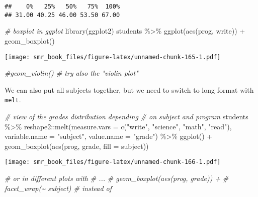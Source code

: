 \documentclass[
  oneside]{book}
\newenvironment{Shaded}{\begin{snugshade}}{\end{snugshade}}
\newcommand{\AttributeTok}[1]{\textcolor[rgb]{0.77,0.63,0.00}{#1}}
\newcommand{\CommentTok}[1]{\textcolor[rgb]{0.56,0.35,0.01}{\textit{#1}}}
\newcommand{\FunctionTok}[1]{\textcolor[rgb]{0.00,0.00,0.00}{#1}}
\newcommand{\NormalTok}[1]{#1}
\newcommand{\SpecialCharTok}[1]{\textcolor[rgb]{0.00,0.00,0.00}{#1}}
\newcommand{\StringTok}[1]{\textcolor[rgb]{0.31,0.60,0.02}{#1}}
\begin{document}
\begin{verbatim}
##    0%   25%   50%   75%  100% 
## 31.00 40.25 46.00 53.50 67.00
\end{verbatim}

\begin{Shaded}
\begin{Highlighting}[]
\CommentTok{\# boxplot in ggplot}
\FunctionTok{library}\NormalTok{(ggplot2)}
\NormalTok{students }\SpecialCharTok{\%\textgreater{}\%}
  \FunctionTok{ggplot}\NormalTok{(}\FunctionTok{aes}\NormalTok{(prog, write)) }\SpecialCharTok{+}
  \FunctionTok{geom\_boxplot}\NormalTok{()}
\end{Highlighting}
\end{Shaded}

\texttt{[image: smr\_book\_files/figure-latex/unnamed-chunk-165-1.pdf]}

\begin{Shaded}
\begin{Highlighting}[]
  \CommentTok{\#geom\_violin() \# try also the "violin plot"}
\end{Highlighting}
\end{Shaded}

We can also put all subjects together, but we need to
switch to long format with \texttt{melt}.

\begin{Shaded}
\begin{Highlighting}[]
\CommentTok{\# view of the grades distribution depending}
\CommentTok{\# on subject and program}
\NormalTok{students }\SpecialCharTok{\%\textgreater{}\%}
\NormalTok{  reshape2}\SpecialCharTok{::}\FunctionTok{melt}\NormalTok{(}\AttributeTok{measure.vars =} \FunctionTok{c}\NormalTok{(}\StringTok{"write"}\NormalTok{, }\StringTok{"science"}\NormalTok{, }\StringTok{"math"}\NormalTok{, }\StringTok{"read"}\NormalTok{),}
       \AttributeTok{variable.name =} \StringTok{"subject"}\NormalTok{,}
       \AttributeTok{value.name =} \StringTok{"grade"}\NormalTok{) }\SpecialCharTok{\%\textgreater{}\%}
  \FunctionTok{ggplot}\NormalTok{() }\SpecialCharTok{+}
    \FunctionTok{geom\_boxplot}\NormalTok{(}\FunctionTok{aes}\NormalTok{(prog, grade, }\AttributeTok{fill =}\NormalTok{ subject))}
\end{Highlighting}
\end{Shaded}

\texttt{[image: smr\_book\_files/figure-latex/unnamed-chunk-166-1.pdf]}

\begin{Shaded}
\begin{Highlighting}[]
\CommentTok{\# or in different plots with}
\CommentTok{\#    ...}
\CommentTok{\#    geom\_boxplot(aes(prog, grade)) +}
\CommentTok{\#    facet\_wrap(\textasciitilde{} subject) \# instead of }
\end{Highlighting}
\end{Shaded}
\end{document}

